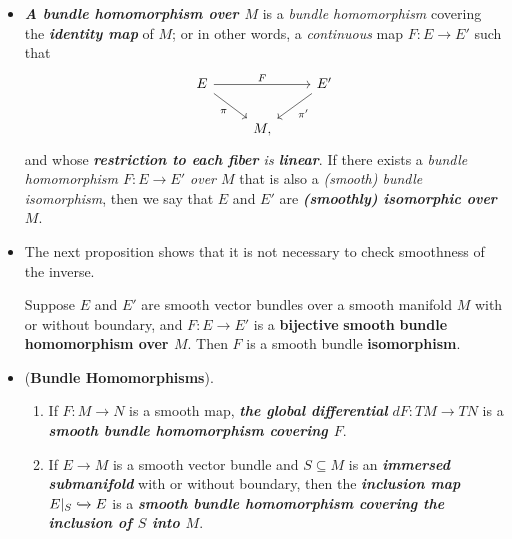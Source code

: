 \documentclass[11pt]{article}
\begin{document}
\begin{itemize}
\item \begin{definition}
\emph{\textbf{A bundle homomorphism over $M$}} is a \emph{bundle homomorphism} covering the
\emph{\textbf{identity map}} of $M$; or in other words, a \emph{continuous} map $F: E \rightarrow E'$ such that
\[
  \begin{tikzcd}
    E \arrow{rr}{F} \arrow[swap]{dr}{\pi} &  & E' \arrow{dl}{\pi'} \\
    & M,              &  
  \end{tikzcd}
\]
and whose \emph{\textbf{restriction to each fiber} is \textbf{linear}}. If there exists a \emph{bundle homomorphism $F: E \rightarrow E'$ over $M$} that is also a \emph{(smooth) bundle isomorphism}, then we say that $E$ and $E'$ are \emph{\textbf{(smoothly) isomorphic over $M$}}. 
\end{definition}

\item The next proposition shows that it is not necessary to check smoothness of the inverse. 
\begin{proposition}
Suppose $E$ and $E'$ are smooth vector bundles over a smooth manifold $M$ with or without boundary, and $F: E \rightarrow E'$ is a \textbf{bijective} \textbf{smooth} \textbf{bundle homomorphism over $M$}. Then $F$ is a smooth bundle \textbf{isomorphism}.
\end{proposition}

\item \begin{example} (\textbf{Bundle Homomorphisms}). \\
\begin{enumerate}
\item If $F: M \rightarrow N$ is a smooth map, \textbf{\emph{the global differential}} $dF: TM \rightarrow TN$ is a \emph{\textbf{smooth bundle homomorphism covering $F$}}.
\item If $E \rightarrow M$ is a smooth vector bundle and $S \subseteq M$ is an \emph{\textbf{immersed submanifold}} with or without boundary, then the \emph{\textbf{inclusion map}} $E|_{S} \xhookrightarrow{} E$ is a \emph{\textbf{smooth bundle homomorphism covering the inclusion of $S$ into $M$}}.
\end{enumerate}
\end{example}


\end{itemize}
\end{document}
